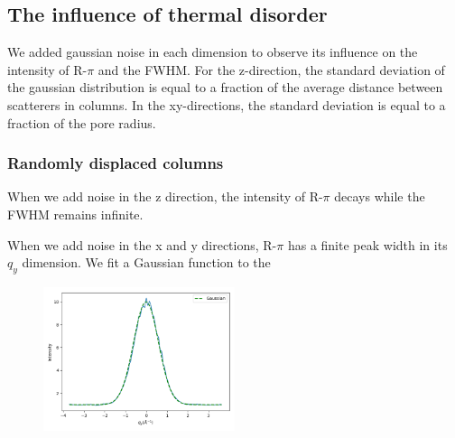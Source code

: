 \documentclass{article}
\begin{document}

  \subsection{The influence of thermal disorder}

  We added gaussian noise in each dimension to observe its influence on the intensity
  of R-$\pi$ and the FWHM. For the z-direction, the standard deviation of the 
  gaussian distribution is equal to a fraction of the average distance between scatterers
  in columns. In the xy-directions, the standard deviation is equal to a fraction 
  of the pore radius.

  \subsubsection{Randomly displaced columns}

  When we add noise in the z direction, the intensity of R-$\pi$ decays while the
  FWHM remains infinite.

  When we add noise in the x and y directions, R-$\pi$ has a finite peak width in its 
  $q_y$ dimension. We fit a Gaussian function to the  

  \begin{figure}
  \centering
  \includegraphics[width=0.5\textwidth]{random_columns_gaussian.png}
  \caption{}\label{fig:FWHM_columns}
  \end{figure}
\end{document}
